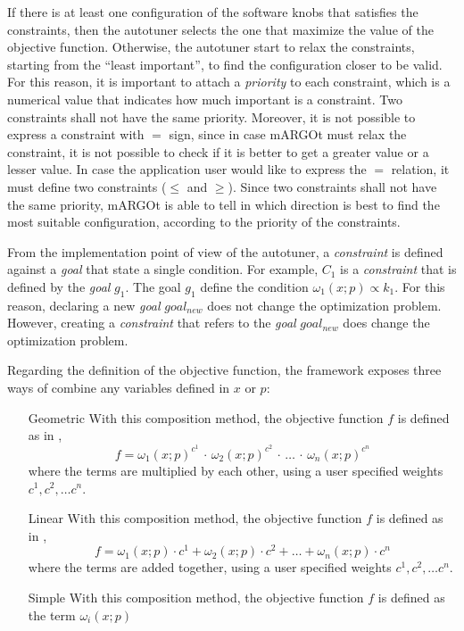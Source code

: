 If there is at least one configuration of the software knobs that satisfies the constraints, then the autotuner selects the one that maximize the value of the objective function.
Otherwise, the autotuner start to relax the constraints, starting from the ``least important'', to find the configuration closer to be valid.
For this reason, it is important to attach a \textit{priority} to each constraint, which is a numerical value that indicates how much important is a constraint.
Two constraints shall not have the same priority.
Moreover, it is not possible to express a constraint with $=$ sign, since in case mARGOt must relax the constraint, it is not possible to check if it is better to get a greater value or a lesser value.
In case the application user would like to express the $=$ relation, it must define two constraints ($\leq$ and $\geq$).
Since two constraints shall not have the same priority, mARGOt is able to tell in which direction is best to find the most suitable configuration, according to the priority of the constraints.

From the implementation point of view of the autotuner, a \textit{constraint} is defined against a \textit{goal} that state a single condition.
For example, $ C_1 $ is a \textit{constraint} that is defined by the \textit{goal} $ g_1 $.
The goal $ g_1 $ define the condition $ \omega_1(x;p) \propto k_1 $.
For this reason, declaring a new \textit{goal} $ goal_{new} $ does not change the optimization problem.
However, creating a \textit{constraint} that refers to the \textit{goal} $ goal_{new} $ does change the optimization problem.

Regarding the definition of the objective function, the framework exposes three ways of combine any variables defined in $x$ or $p$:
\begin{itemize}
	\item[Geometric] With this composition method, the objective function $f$ is defined as in ,
		\begin{equation}
		\label{eq:gemetric_combination}
		f = \omega_1(x;p)^{c^1} \, \cdot \, \omega_2(x;p)^{c^2} \, \cdot \, \dots \, \cdot \, \omega_n(x;p)^{c^n}
		\end{equation}
		where the terms are multiplied by each other, using a user specified weights $c^1, c^2, \dots c^n$.
	\item[Linear] With this composition method, the objective function $f$ is defined as in ,
		\begin{equation}
		\label{eq:linear_combination}
		f = \omega_1(x;p)\cdot{c^1}+\omega_2(x;p)\cdot{c^2}+\dots+\omega_n(x;p)\cdot{c^n}
		\end{equation}
		where the terms are added together, using a user specified weights $c^1, c^2, \dots c^n$.
	\item[Simple] With this composition method, the objective function $f$ is defined as the term $\omega_i(x;p)$
\end{itemize}

